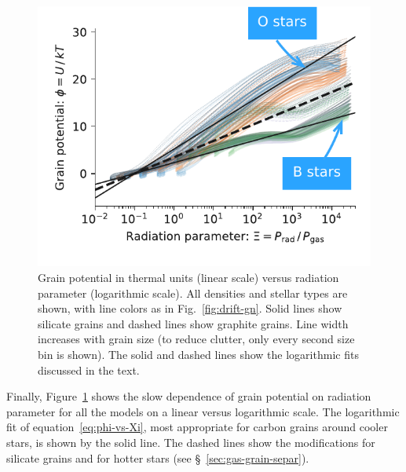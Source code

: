 \begin{figure}
  \centering
  \includegraphics[width=\linewidth]{figs/phi-versus-xi-annotate}
  \caption{Grain potential in thermal units (linear scale) versus
    radiation parameter (logarithmic scale). All densities and stellar
    types are shown, with line colors as in Fig.~\ref{fig:drift-gn}.
    Solid lines show silicate grains and dashed lines show graphite
    grains.  Line width increases with grain size (to reduce clutter,
    only every second size bin is shown).  The solid and dashed lines
    show the logarithmic fits discussed in the text.}
  \label{fig:phi-vs-Xi}
\end{figure}
Finally, Figure~\ref{fig:phi-vs-Xi} shows the slow dependence of grain
potential on radiation parameter for all the models on a linear versus
logarithmic scale.  The logarithmic fit of
equation~\eqref{eq:phi-vs-Xi}, most appropriate for carbon grains
around cooler stars, is shown by the solid line.  The dashed lines
show the modifications for silicate grains and for hotter stars (see
\S~\ref{sec:gas-grain-separ}).

